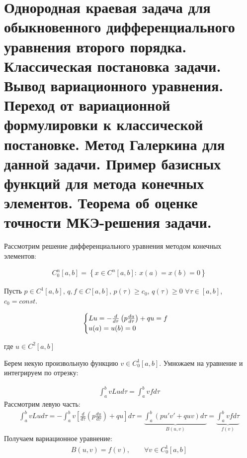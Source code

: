 \documentclass[__main__.tex]{subfiles}
\begin{document}
\section{Однородная краевая задача для обыкновенного дифференциального уравнения второго порядка. Классическая постановка задачи. Вывод вариационного уравнения. Переход от вариационной формулировки к классической постановке. Метод Галеркина для данной задачи. Пример базисных функций для метода конечных элементов. Теорема об оценке точности МКЭ-решения задачи.}

Рассмотрим решение дифференциального уравнения методом конечных элементов:

\begin{gather*}
	C_0^n[a, b]=\left\{x \in C^n[a,b]: \ x(a)=x(b)=0\right\}
\end{gather*}

Пусть $p \in C^1[a, b]$, $q, f \in C[a,b]$, $p(\tau) \geq c_0$, $q(\tau)\geq 0$ $\forall \tau \in [a,b]$, $c_0=const$. 

\begin{gather*}
	\begin{cases}
		Lu=-\frac{d}{d\tau}\left(p\frac{du}{d\tau}\right)+qu=f \hfill \\
		u(a)=u(b)=0 \hfill \\	
	\end{cases} 
\end{gather*}

где $u \in C^2[a, b]$ 

Берем некую произвольную функцию $v \in C^1_0[a,b]$. Умножаем на уравнение и интегрируем по отрезку:

\begin{gather*}
	\int_{a}^{b}vLud\tau =\int_{a}^{b}vfd\tau	
\end{gather*}
Рассмотрим левую часть:
\begin{gather*}
	\int_{a}^{b}vLud\tau = -\int_{a}^{b}v\left[\frac{d}{d\tau}\left(p\frac{du}{d\tau}\right)+qu\right]d\tau = \underbrace{\int_a^b(pu'v'+quv)d\tau}_{B(u,v)}= \underbrace{\int_a^bvfd\tau}_{f(v)}
\end{gather*}	
Получаем вариационное уравнение:
\begin{gather*}
	B(u,v)=f(v), \qquad \forall v \in C_0^1[a,b]	
\end{gather*}
\end{document}

